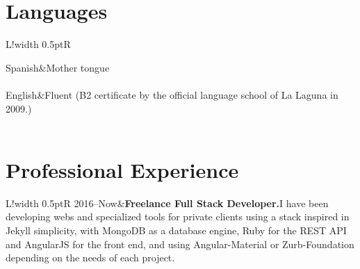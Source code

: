 \documentclass[10pt]{article}
\newcommand\VRule{\color{lightgray}\vrule width 0.5pt}
\begin{document}
    \section*{Languages}
    \begin{tabular}{L!{\VRule}R}

        Spanish&Mother tongue\\\\

        English&Fluent (B2 certificate by the official language school of La Laguna in 2009.)\\\\

    \end{tabular}

    \section*{Professional Experience}
    \begin{tabular}{L!{\VRule}R}
        2016--Now&{{\bf Freelance Full Stack Developer.}\newline I have been developing webs and specialized tools for private clients using a stack inspired in Jekyll simplicity, with MongoDB as a database engine, Ruby for the REST API and AngularJS for the front end, and using Angular-Material or Zurb-Foundation depending on the needs of each project.}\\\\

    \end{tabular}
\end{document}
